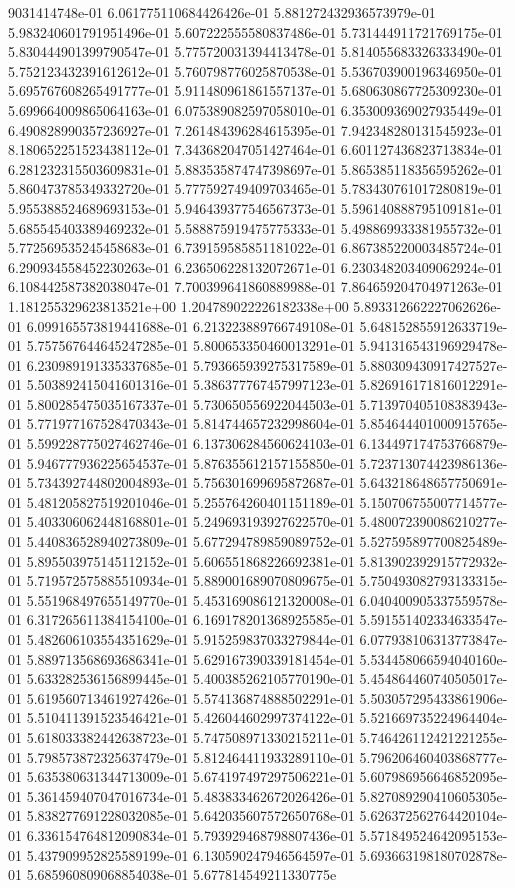 9031414748e-01	6.061775110684426426e-01	5.881272432936573979e-01	5.983240601791951496e-01	5.607222555580837486e-01	5.731444911721769175e-01	5.830444901399790547e-01	5.775720031394413478e-01	5.814055683326333490e-01	5.752123432391612612e-01	5.760798776025870538e-01	5.536703900196346950e-01	5.695767608265491777e-01	5.911480961861557137e-01	5.680630867725309230e-01	5.699664009865064163e-01	6.075389082597058010e-01	6.353009369027935449e-01	6.490828990357236927e-01	7.261484396284615395e-01	7.942348280131545923e-01	8.180652251523438112e-01	7.343682047051427464e-01	6.601127436823713834e-01	6.281232315503609831e-01	5.883535874747398697e-01	5.865385118356595262e-01	5.860473785349332720e-01	5.777592749409703465e-01	5.783430761017280819e-01	5.955388524689693153e-01	5.946439377546567373e-01	5.596140888795109181e-01	5.685545403389469232e-01	5.588875919475775333e-01	5.498869933381955732e-01	5.772569535245458683e-01	6.739159585851181022e-01	6.867385220003485724e-01	6.290934558452230263e-01	6.236506228132072671e-01	6.230348203409062924e-01	6.108442587382038047e-01	7.700399641860889988e-01	7.864659204704971263e-01	1.181255329623813521e+00	1.204789022226182338e+00	5.893312662227062626e-01	6.099165573819441688e-01	6.213223889766749108e-01	5.648152855912633719e-01	5.757567644645247285e-01	5.800653350460013291e-01	5.941316543196929478e-01	6.230989191335337685e-01	5.793665939275317589e-01	5.880309430917427527e-01	5.503892415041601316e-01	5.386377767457997123e-01	5.826916171816012291e-01	5.800285475035167337e-01	5.730650556922044503e-01	5.713970405108383943e-01	5.771977167528470343e-01	5.814744657232998604e-01	5.854644401000915765e-01	5.599228775027462746e-01	6.137306284560624103e-01	6.134497174753766879e-01	5.946777936225654537e-01	5.876355612157155850e-01	5.723713074423986136e-01	5.734392744802004893e-01	5.756301699695872687e-01	5.643218648657750691e-01	5.481205827519201046e-01	5.255764260401151189e-01	5.150706755007714577e-01	5.403306062448168801e-01	5.249693193927622570e-01	5.480072390086210277e-01	5.440836528940273809e-01	5.677294789859089752e-01	5.527595897700825489e-01	5.895503975145112152e-01	5.606551868226692381e-01	5.813902392915772932e-01	5.719572575885510934e-01	5.889001689070809675e-01	5.750493082793133315e-01	5.551968497655149770e-01	5.453169086121320008e-01	6.040400905337559578e-01	6.317265611384154100e-01	6.169178201368925585e-01	5.591551402334633547e-01	5.482606103554351629e-01	5.915259837033279844e-01	6.077938106313773847e-01	5.889713568693686341e-01	5.629167390339181454e-01	5.534458066594040160e-01	5.633282536156899445e-01	5.400385262105770190e-01	5.454864460740505017e-01	5.619560713461927426e-01	5.574136874888502291e-01	5.503057295433861906e-01	5.510411391523546421e-01	5.426044602997374122e-01	5.521669735224964404e-01	5.618033382442638723e-01	5.747508971330215211e-01	5.746426112421221255e-01	5.798573872325637479e-01	5.812464411933289110e-01	5.796206460403868777e-01	5.635380631344713009e-01	5.674197497297506221e-01	5.607986956646852095e-01	5.361459407047016734e-01	5.483833462672026426e-01	5.827089290410605305e-01	5.838277691228032085e-01	5.642035607572650768e-01	5.626372562764420104e-01	6.336154764812090834e-01	5.793929468798807436e-01	5.571849524642095153e-01	5.437909952825589199e-01	6.130590247946564597e-01	5.693663198180702878e-01	5.685960809068854038e-01	5.677814549211330775e